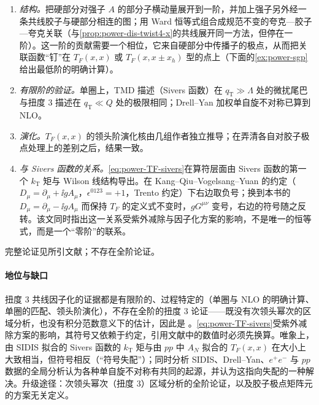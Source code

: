 \begin{proofsketch}
\begin{enumerate}[label=\arabic*.,leftmargin=1.6em,itemsep=1pt,topsep=2pt]
\item \emph{结构。}把硬部分对强子 $A$ 的部分子横动量展开到一阶，并加上强子另外经一条共线胶子与硬部分相连的图；用 Ward 恒等式组合成规范不变的夸克—胶子—夸克关联（与\cref{prop:power-dis-twist4-x}的共线展开同一方法，但停在一阶）。这一阶的贡献需要一个相位，它来自硬部分中传播子的极点，从而把关联函数“钉”在 $T_F(x,x)$ 或 $T_F(x,x\pm x_h)$ 型的点上（下面的\cref{ex:power-sgp}给出最低阶的明确计算）。
\item \emph{有限阶的验证。}单圈上，TMD 描述（Sivers 函数）在 $q_{\mathrm T}\gg\Lambda$ 处的微扰尾巴与扭度 3 描述在 $q_{\mathrm T}\ll Q$ 处的极限相同\cite{Ji:2006ub}；Drell--Yan 加权单自旋不对称已算到 NLO\cite{Vogelsang:2009pj}。
\item \emph{演化。}$T_F(x,x)$ 的领头阶演化核由几组作者独立推导；在弄清各自对胶子极点处理上的差别之后，结果一致\cite{Braun:2009mi,Kang:2008ey,Kang:2012em,Schafer:2012ra}。
\item \emph{与 Sivers 函数的关系。}\eqref{eq:power-TF-sivers}在算符层面由 Sivers 函数的第一个 $k_{\mathrm T}$ 矩与 Wilson 线结构导出\cite{Boer:2003cm}。在 Kang--Qiu--Vogelsang--Yuan 的约定（$D_\mu=\partial_\mu+\ii gA_\mu$，$\epsilon^{0123}=+1$，Trento 约定）下右边取负号\cite[式~(10)]{Kang:2011hk}；换到本书的 $D_\mu=\partial_\mu-\ii gA_\mu$ 而保持 $T_F$ 的定义式不变时，$gG^{\mu\nu}$ 变号，右边的符号随之反转。该文同时指出这一关系受紫外减除与因子化方案的影响，不是唯一的恒等式，而是一个“零阶”的联系\cite[第~II~节]{Kang:2011hk}。
\end{enumerate}
完整论证见所引文献；不存在全阶论证。
\end{proofsketch}

\paragraph{地位与缺口}
扭度 3 共线因子化的证据都是有限阶的、过程特定的（单圈与 NLO 的明确计算、单圈的匹配、领头阶演化），不存在全阶的扭度 3 论证——既没有次领头幂次的区域分析，也没有积分范数意义下的估计，因此是 \tagP。\eqref{eq:power-TF-sivers}受紫外减除方案的影响\cite[第~II~节]{Kang:2011hk}，其符号又依赖于约定，引用文献中的数值时必须先换算。唯象上，由 SIDIS 拟合的 Sivers 函数的 $k_{\mathrm T}$ 矩与由 $pp$ 中 $A_N$ 拟合的 $T_F(x,x)$ 在大小上大致相当，但符号相反（“符号失配”）\cite{Kang:2011hk}；同时分析 SIDIS、Drell--Yan、$e^+e^-$ 与 $pp$ 数据的全局分析认为各种单自旋不对称有共同的起源，并认为这指向失配的一种解决\cite{Cammarota:2020qcw}。升级途径：次领头幂次（扭度 3）区域分析的全阶论证，以及胶子极点矩阵元的方案无关定义。


